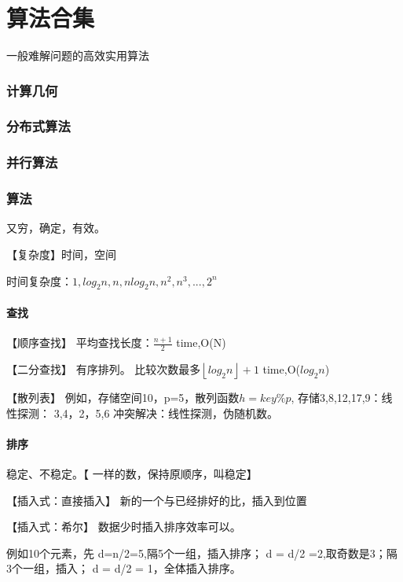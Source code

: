 \documentclass[UTF8]{../computerUniverse}
\begin{document}
\chapter{算法合集}
一般难解问题的高效实用算法





\subsection{计算几何}

\subsection{分布式算法}
\subsection{并行算法}





\subsection{算法}
又穷，确定，有效。

【复杂度】时间，空间

时间复杂度：$1,log_2n,n,nlog_2n,n^2,n^3,...,2^n$

\subsubsection{查找}

【顺序查找】
平均查找长度：$\frac{n+1}{2}$
time,O(N)

【二分查找】
有序排列。
比较次数最多$\left\lfloor log_2n\right\rfloor +1$
time,O($log_2n$)

【散列表】
例如，存储空间10，p=5，散列函数$h=key\%p$,
存储3,8,12,17,9：线性探测： 3,4，2，5,6
冲突解决：线性探测，伪随机数。

\subsubsection{排序}

稳定、不稳定。【 一样的数，保持原顺序，叫稳定】

【插入式：直接插入】
新的一个与已经排好的比，插入到位置

【插入式：希尔】
数据少时插入排序效率可以。

例如10个元素，先
d=n/2=5,隔5个一组，插入排序；
d = d/2  =2,取奇数是3；隔3个一组，插入；
d = d/2 = 1，全体插入排序。
\end{document}

